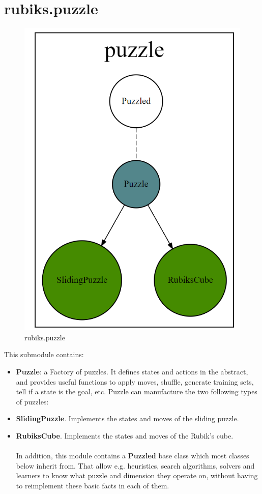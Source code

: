 \section{rubiks.puzzle}
\begin{figure}[H]
\centering
\includegraphics[scale=0.25]{./Figures/codebasepuzzle}
\caption[Codebase]{rubiks.puzzle}
\label{fig:Codebasepuzzle}
\end{figure}
This submodule contains:
\begin{itemize}
\item \textbf{Puzzle}: a Factory of puzzles. It defines states and actions in the abstract, and provides useful functions to apply moves, shuffle, generate training sets, tell if a state is the goal, etc. Puzzle can manufacture the two following types of puzzles:
\item \textbf{SlidingPuzzle}. Implements the states and moves of the sliding puzzle.
\item \textbf{RubiksCube}. Implements the states and moves of the Rubik's cube.
\\
\\
In addition, this module contains a \textbf{Puzzled} base class which most classes below inherit from. That allow e.g. heuristics, search algorithms, solvers and learners to know what puzzle and dimension they operate on, without having to reimplement these basic facts in each of them.
\end{itemize}


